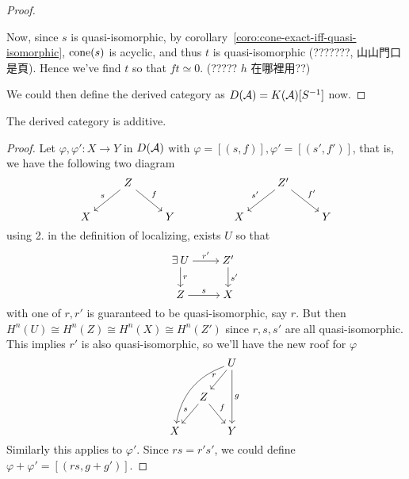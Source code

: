 \begin{theorem}
\begin{proof}
\begin{enumerate}
        Now, since $s$ is quasi-isomorphic, by corollary~\ref{coro:cone-exact-iff-quasi-isomorphic},
        $\operatorname{cone}(s)$ is acyclic, and thus $t$ is quasi-isomorphic (???????, 山山門口是頁).
        Hence we've find $t$ so that $ft \simeq 0$. (????? $h$ 在哪裡用??)
    \end{enumerate}
    We could then define the derived category as $D(\mathcal{A}) = K(\mathcal{A})[S^{-1}]$ now.
  \end{proof}
\end{theorem}

\begin{prop}
  The derived category is additive.

  \begin{proof}
    Let $\varphi, \varphi' : X \to Y$ in $D(\mathcal{A})$ with
    $\varphi = [(s, f)], \varphi' = [(s', f')]$, that is, we have the following two diagram
    \[ \begin{tikzcd}[cramped]
        & Z \ar[ld, "s"'] \ar[rd, "f"] & & & & Z' \ar[ld, "s'"'] \ar[rd, "f'"] & \\
        X &   & Y & & X & & Y 
      \end{tikzcd} \]
    using 2. in the definition of localizing,
    exists $U$ so that
    \[ \begin{tikzcd}[cramped]
        \exists U \ar[r, "r'"] \ar[d, "r"] & Z' \ar[d, "s'"] \\
        Z \ar[r, "s"] & X
      \end{tikzcd} \]
    with one of $r, r'$ is guaranteed to be quasi-isomorphic, say $r$.
    But then $H^n(U) \cong H^n(Z) \cong H^n(X) \cong H^n(Z')$
    since $r, s, s'$ are all quasi-isomorphic. This implies $r'$
    is also quasi-isomorphic, so we'll have the new roof for $\varphi$
    \[ \begin{tikzcd}[cramped, column sep=small]
        & & U \ar[ld, "r"'] \ar[lldd, bend right] \ar[dd, "g"] \\
        & Z \ar[ld, "s"'] \ar[rd, "f"] & \\
        X & & Y
      \end{tikzcd} \]
    Similarly this applies to $\varphi'$. Since $rs = r's'$, we could
    define $\varphi + \varphi' = [(rs, g+g')]$.
  \end{proof}
\end{prop}

